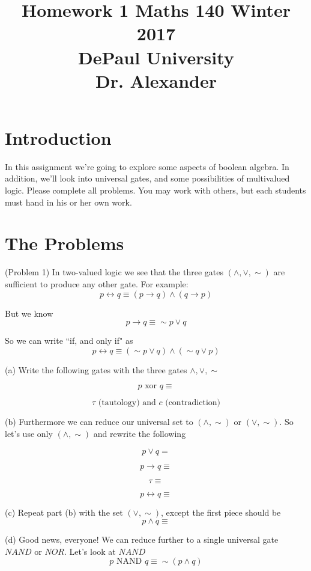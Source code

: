\documentclass[16 pt]{amsart}
\theoremstyle{definition}
\theoremstyle{remark}
\numberwithin{equation}{subsection}
\begin{document}
\title{Homework 1 Maths 140 Winter 2017 \\ DePaul University\\Dr. Alexander}
\maketitle

\section{Introduction}

In this assignment we're going to explore some aspects of boolean algebra.  In addition, we'll look into universal gates, and some possibilities of multivalued logic.  Please complete all problems.  You may work with others, but each students must hand in his or her own work.

\section{The Problems}

(Problem 1) In two-valued logic we see that the three gates $(\wedge, \vee, \sim)$ are sufficient to produce any other gate.  For example:
\[
p \leftrightarrow q \equiv (p\rightarrow q) \wedge (q\rightarrow p)
\]

But we know
\[
p\rightarrow q \equiv \sim p \vee q
\]

So we can write ``if, and only if" as
\[
p\leftrightarrow q \equiv (\sim p \vee q)\wedge (\sim q\vee p)
\]

(a) Write the following gates with the three gates $\wedge,\vee,\sim$

\[
p \text{ xor } q \equiv 
\]

\[
\tau \text{ (tautology) and } c \text{ (contradiction)} 
\]


(b) Furthermore we can reduce our universal set to $(\wedge,\sim)$ or $(\vee,\sim)$.  So let's use only $(\wedge,\sim)$ and rewrite the following

\[
p \vee q = 
\]

\[
p\rightarrow q \equiv
\]

\[
\tau \equiv
\]

\[
p \leftrightarrow q \equiv
\]

(c) Repeat part (b) with the set $(\vee,\sim)$, except the first piece should be
\[
p\wedge q \equiv
\]

(d) Good news, everyone!  We can reduce further to a single universal gate $NAND$ or $NOR$.
Let's look at $NAND$
\[
p \text{ NAND } q \equiv \sim(p\wedge q)
\]
\end{document}
